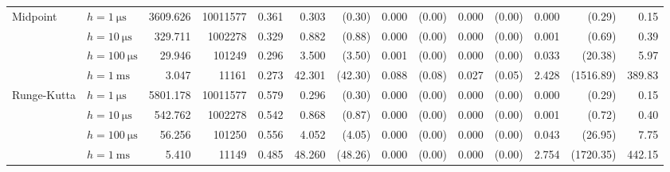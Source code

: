 \begin{sidewaystable}[p]
\begin{tabular}{p{1.5cm} l r r r rr rr rr rr r}
	\multirow{4}{*}{\parbox{1.5cm}{\raggedleft Midpoint}}
		& $h=\SI{1}{\micro\second}$	&   3609.626	& 10011577	&      0.361	&      0.303	& (0.30)	&      0.000	& (0.00)	&      0.000	& (0.00)	&      0.000	& (0.29)	& 0.15\\
		& $h=\SI{10}{\micro\second}$	&    329.711	&  1002278	&      0.329	&      0.882	& (0.88)	&      0.000	& (0.00)	&      0.000	& (0.00)	&      0.001	& (0.69)	& 0.39\\
		& $h=\SI{100}{\micro\second}$	&     29.946	&   101249	&      0.296	&      3.500	& (3.50)	&      0.001	& (0.00)	&      0.000	& (0.00)	&      0.033	& (20.38)	& 5.97\\
		& $h=\SI{1}{\milli\second}$	&      3.047	&    11161	&      0.273	&     42.301	& (42.30)	&      0.088	& (0.08)	&      0.027	& (0.05)	&      2.428	& (1516.89)	& 389.83\\

	\cmidrule(r){1-2}\cmidrule(r){3-5}\cmidrule(r){6-7}\cmidrule(r){8-9}\cmidrule(r){10-11}\cmidrule(r){12-13}\cmidrule(l){14-14}

	\multirow{4}{*}{\parbox{1.5cm}{\raggedleft Runge-Kutta}}
		& $h=\SI{1}{\micro\second}$	&   5801.178	& 10011577	&      0.579	&      0.296	& (0.30)	&      0.000	& (0.00)	&      0.000	& (0.00)	&      0.000	& (0.29)	& 0.15\\
		& $h=\SI{10}{\micro\second}$	&    542.762	&  1002278	&      0.542	&      0.868	& (0.87)	&      0.000	& (0.00)	&      0.000	& (0.00)	&      0.001	& (0.72)	& 0.40\\
		& $h=\SI{100}{\micro\second}$	&     56.256	&   101250	&      0.556	&      4.052	& (4.05)	&      0.000	& (0.00)	&      0.000	& (0.00)	&      0.043	& (26.95)	& 7.75\\
		& $h=\SI{1}{\milli\second}$	&      5.410	&    11149	&      0.485	&     48.260	& (48.26)	&      0.000	& (0.00)	&      0.000	& (0.00)	&      2.754	& (1720.35)	& 442.15\\

	\cmidrule(r){1-2}\cmidrule(r){3-5}\cmidrule(r){6-7}\cmidrule(r){8-9}\cmidrule(r){10-11}\cmidrule(r){12-13}\cmidrule(l){14-14}


\end{tabular}
\end{sidewaystable}
